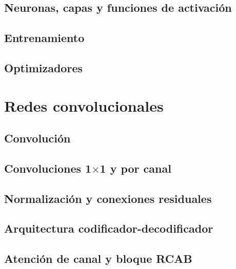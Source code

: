 \documentclass[
  11pt,
  oneside,
  english,
  spanish,
  singlespacing,
  headsepline
]{MastersDoctoralThesis}
\begin{document}
\subsection{Neuronas, capas y funciones de activación}
\label{sec:capas-activaciones}

\subsection{Entrenamiento}
\label{sec:entrenamiento}

\subsection{Optimizadores}
\label{sec:optimizadores}

\section{Redes convolucionales}
\label{sec:convolucionales}

\subsection{Convolución}
\label{sec:convolucion}

\subsection{Convoluciones \texorpdfstring{1$\times$1}{1x1} y por canal}
\label{sec:conv-1x1-depthwise}

\subsection{Normalización y conexiones residuales}
\label{sec:normalizacion-residual}

\subsection{Arquitectura codificador-decodificador}
\label{sec:unet}

\subsection{Atención de canal y bloque RCAB}
\label{sec:rcab}
\end{document}
